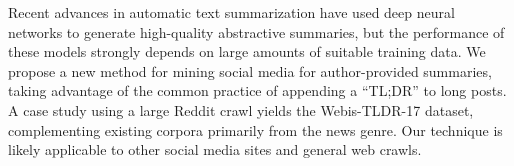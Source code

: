 Recent advances in automatic text summarization have used deep neural networks to generate high-quality abstractive summaries, but the performance of these models strongly depends on large amounts of suitable training data. We propose a new method for mining social media for author-provided summaries, taking advantage of the common practice of appending a ``TL;DR'' to long posts. A case study using a large Reddit crawl yields the Webis-TLDR-17 dataset, complementing existing corpora primarily from the news genre. Our technique is likely applicable to other social media sites and general web crawls.

